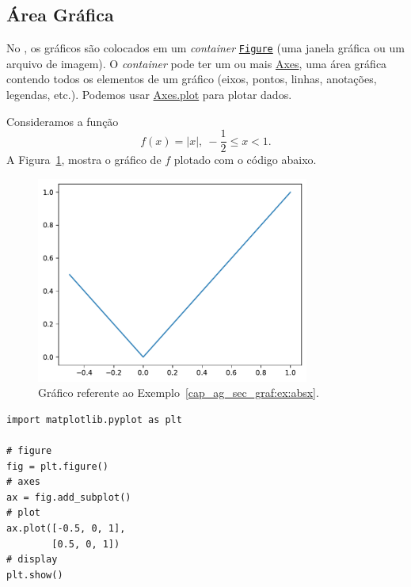 \subsection{Área Gráfica}

No {\matplotlib}, os gráficos são colocados em um \textit{container} \href{https://matplotlib.org/stable/api/figure_api.html#matplotlib.figure.Figure}{\lstinline+Figure+} (uma janela gráfica ou um arquivo de imagem). O \textit{container} pode ter um ou mais \href{https://matplotlib.org/stable/api/_as_gen/matplotlib.axes.Axes.html#matplotlib.axes.Axes}{Axes}, uma área gráfica contendo todos os elementos de um gráfico (eixos, pontos, linhas, anotações, legendas, etc.). Podemos usar \href{https://matplotlib.org/stable/api/_as_gen/matplotlib.axes.Axes.plot.html#matplotlib.axes.Axes.plot}{Axes.plot} para plotar dados.

\begin{ex}\label{cap_ag_sec_graf:ex:fig_absx}
  Consideramos a função
  \begin{equation}
    f(x) = |x|, ~-\frac{1}{2}\leq x < 1.
  \end{equation}
  A Figura~\ref{cap_ag_sec_graf:fig:absx}, mostra o gráfico de $f$ plotado com o código abaixo.

  \begin{figure}[H]
    \centering
    \includegraphics[width=0.8\textwidth]{./cap_ag/dados/fig_absx/fig}
    \caption{Gráfico referente ao Exemplo~\ref{cap_ag_sec_graf:ex:absx}.}
    \label{cap_ag_sec_graf:fig:absx}
  \end{figure}
  
\begin{lstlisting}
import matplotlib.pyplot as plt

# figure
fig = plt.figure()
# axes
ax = fig.add_subplot()
# plot
ax.plot([-0.5, 0, 1],
        [0.5, 0, 1])
# display
plt.show()
\end{lstlisting}

\end{ex}


